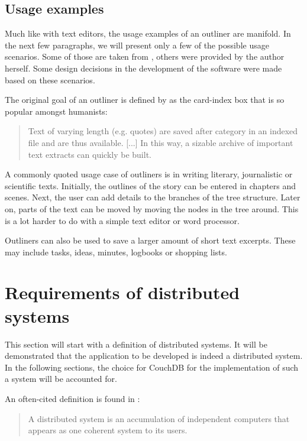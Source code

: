 \subsection{Usage examples}
\label{subsec:einsatzmoegl}

Much like with text editors, the usage examples of an outliner are manifold. In the next few paragraphs, we will present only a few of the possible usage scenarios. Some of those are taken from \cite{gliederungseditor}, others were provided by the author herself. Some design decisions in the development of the software were made based on these scenarios.

The original goal of an outliner is defined by \cite{gliederungseditor} as the card-index box that is so popular amongst humanists:

\begin{quote}
Text of varying length (e.g. quotes) are saved after category in an indexed file and are thus available. [...] In this way, a sizable archive of important text extracts can quickly be built.
\end{quote}

A commonly quoted usage case of outliners is in writing literary, journalistic or scientific texts. Initially, the outlines of the story can be entered in chapters and scenes. Next, the user can add details to the branches of the tree structure. Later on, parts of the text can be moved by moving the nodes in the tree around. This is a lot harder to do with a simple text editor or word processor.

Outliners can also be used to save a larger amount of short text excerpts. These may include tasks, ideas, minutes, logbooks or shopping lists.


\section{Requirements of distributed systems}

This section will start with a definition of distributed systems. It will be demonstrated that the application to be developed is indeed a distributed system. In the following sections, the choice for CouchDB for the implementation of such a system will be accounted for.

An often-cited definition is found in :

\begin{quote}
A distributed system is an accumulation of independent computers that appears as one coherent system to its users.
\end{quote}

